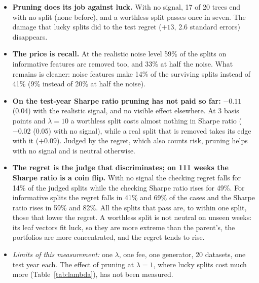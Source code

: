 \documentclass[11pt,a4paper]{article}
\newcommand{\1}{\mathbf{1}}
\begin{document}
\begin{itemize}
\item \textbf{Pruning does its job against luck.} With no signal, 17 of 20 trees end with no split (none before), and a worthless split passes once in seven. The damage that lucky splits did to the test regret ($+13$, 2.6 standard errors) disappears.
\item \textbf{The price is recall.} At the realistic noise level 59\% of the splits on informative features are removed too, and 33\% at half the noise. What remains is cleaner: noise features make 14\% of the surviving splits instead of 41\% (9\% instead of 20\% at half the noise).
\item \textbf{On the test-year Sharpe ratio pruning has not paid so far:} $-0.11$ (0.04) with the realistic signal, and no visible effect elsewhere. At 3 basis points and $\lambda=10$ a worthless split costs almost nothing in Sharpe ratio ($-0.02$ (0.05) with no signal), while a real split that is removed takes its edge with it ($+0.09$). Judged by the regret, which also counts risk, pruning helps with no signal and is neutral otherwise.
\item \textbf{The regret is the judge that discriminates; on 111 weeks the Sharpe ratio is a coin flip.} With no signal the checking regret falls for 14\% of the judged splits while the checking Sharpe ratio rises for 49\%. For informative splits the regret falls in 41\% and 69\% of the cases and the Sharpe ratio rises in 59\% and 82\%. All the splits that pass are, to within one split, those that lower the regret. A worthless split is not neutral on unseen weeks: its leaf vectors fit luck, so they are more extreme than the parent's, the portfolios are more concentrated, and the regret tends to rise.
\item \emph{Limits of this measurement:} one $\lambda$, one fee, one generator, 20 datasets, one test year each. The effect of pruning at $\lambda=1$, where lucky splits cost much more (Table~\ref{tab:lambda}), has not been measured.
\end{itemize}
\end{document}
